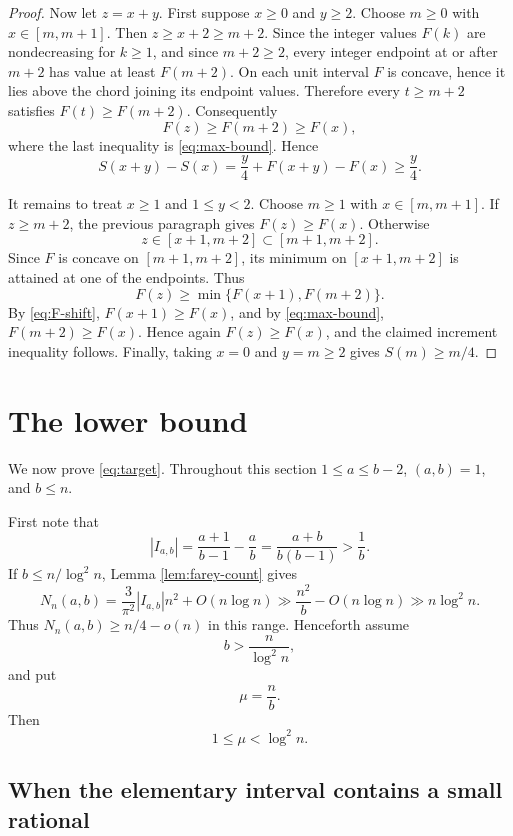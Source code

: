 \documentclass[11pt]{article}
\numberwithin{equation}{section}
\theoremstyle{definition}
\theoremstyle{remark}
\newcommand{\1}{\mathbf 1}
\begin{document}
\begin{proof}
Now let $z=x+y$.  First suppose $x\ge0$ and $y\ge2$.  Choose $m\ge0$ with $x\in[m,m+1]$.  Then $z\ge x+2\ge m+2$.  Since the integer values $F(k)$ are nondecreasing for $k\ge1$, and since $m+2\ge2$, every integer endpoint at or after $m+2$ has value at least $F(m+2)$.  On each unit interval $F$ is concave, hence it lies above the chord joining its endpoint values.  Therefore every $t\ge m+2$ satisfies $F(t)\ge F(m+2)$.  Consequently
\[
  F(z)\ge F(m+2)\ge F(x),
\]
where the last inequality is \eqref{eq:max-bound}.  Hence
\[
  S(x+y)-S(x)=\frac y4+F(x+y)-F(x)\ge\frac y4.
\]

It remains to treat $x\ge1$ and $1\le y<2$.  Choose $m\ge1$ with $x\in[m,m+1]$.  If $z\ge m+2$, the previous paragraph gives $F(z)\ge F(x)$.  Otherwise
\[
  z\in[x+1,m+2]\subset[m+1,m+2].
\]
Since $F$ is concave on $[m+1,m+2]$, its minimum on $[x+1,m+2]$ is attained at one of the endpoints.  Thus
\[
  F(z)\ge \min\{F(x+1),F(m+2)\}.
\]
By \eqref{eq:F-shift}, $F(x+1)\ge F(x)$, and by \eqref{eq:max-bound}, $F(m+2)\ge F(x)$.  Hence again $F(z)\ge F(x)$, and the claimed increment inequality follows.  Finally, taking $x=0$ and $y=m\ge2$ gives $S(m)\ge m/4$.
\end{proof}

\section{The lower bound}

We now prove \eqref{eq:target}.  Throughout this section $1\le a\le b-2$, $(a,b)=1$, and $b\le n$.

First note that
\begin{equation}\label{eq:I-length}
  |I_{a,b}|=\frac{a+1}{b-1}-\frac ab=\frac{a+b}{b(b-1)}>\frac1b.
\end{equation}
If $b\le n/\log^2 n$, Lemma \ref{lem:farey-count} gives
\[
  N_n(a,b)=\frac3{\pi^2}|I_{a,b}|n^2+O(n\log n)
           \gg \frac{n^2}{b}-O(n\log n)
           \gg n\log^2 n.
\]
Thus $N_n(a,b)\ge n/4-o(n)$ in this range.  Henceforth assume
\begin{equation}\label{eq:b-large}
  b>\frac n{\log^2 n},
\end{equation}
and put
\[
  \mu=\frac nb.
\]
Then
\begin{equation}\label{eq:mu-range}
  1\le \mu<\log^2 n.
\end{equation}

\subsection{When the elementary interval contains a small rational}
\end{document}
